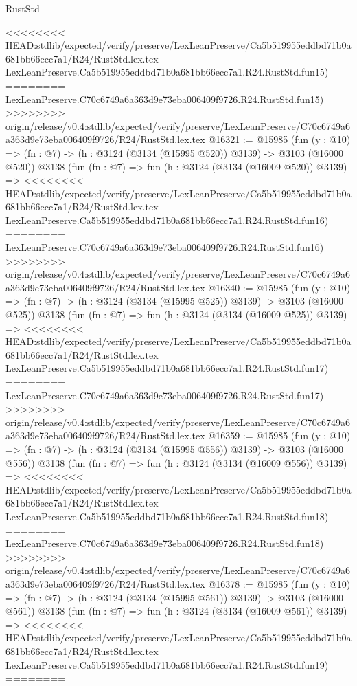 \begin{lexlean}{RustStd}
\begin{coremodule}
{\begin{coremodule}
{{{{{{{{{{{{{{{{{{{{{{{{{{<<<<<<<< HEAD:stdlib/expected/verify/preserve/LexLeanPreserve/Ca5b519955eddbd71b0a681bb66ecc7a1/R24/RustStd.lex.tex
    LexLeanPreserve.Ca5b519955eddbd71b0a681bb66ecc7a1.R24.RustStd.fun15)
========
    LexLeanPreserve.C70c6749a6a363d9e73eba006409f9726.R24.RustStd.fun15)
>>>>>>>> origin/release/v0.4:stdlib/expected/verify/preserve/LexLeanPreserve/C70c6749a6a363d9e73eba006409f9726/R24/RustStd.lex.tex
@16321 := @15985
    (fun (y : @10) => (fn : @7) -> (h : @3124 (@3134 (@15995 @520)) @3139) -> @3103 (@16000 @520))
    @3138
    (fun (fn : @7) =>
    fun (h : @3124 (@3134 (@16009 @520)) @3139) =>
<<<<<<<< HEAD:stdlib/expected/verify/preserve/LexLeanPreserve/Ca5b519955eddbd71b0a681bb66ecc7a1/R24/RustStd.lex.tex
    LexLeanPreserve.Ca5b519955eddbd71b0a681bb66ecc7a1.R24.RustStd.fun16)
========
    LexLeanPreserve.C70c6749a6a363d9e73eba006409f9726.R24.RustStd.fun16)
>>>>>>>> origin/release/v0.4:stdlib/expected/verify/preserve/LexLeanPreserve/C70c6749a6a363d9e73eba006409f9726/R24/RustStd.lex.tex
@16340 := @15985
    (fun (y : @10) => (fn : @7) -> (h : @3124 (@3134 (@15995 @525)) @3139) -> @3103 (@16000 @525))
    @3138
    (fun (fn : @7) =>
    fun (h : @3124 (@3134 (@16009 @525)) @3139) =>
<<<<<<<< HEAD:stdlib/expected/verify/preserve/LexLeanPreserve/Ca5b519955eddbd71b0a681bb66ecc7a1/R24/RustStd.lex.tex
    LexLeanPreserve.Ca5b519955eddbd71b0a681bb66ecc7a1.R24.RustStd.fun17)
========
    LexLeanPreserve.C70c6749a6a363d9e73eba006409f9726.R24.RustStd.fun17)
>>>>>>>> origin/release/v0.4:stdlib/expected/verify/preserve/LexLeanPreserve/C70c6749a6a363d9e73eba006409f9726/R24/RustStd.lex.tex
@16359 := @15985
    (fun (y : @10) => (fn : @7) -> (h : @3124 (@3134 (@15995 @556)) @3139) -> @3103 (@16000 @556))
    @3138
    (fun (fn : @7) =>
    fun (h : @3124 (@3134 (@16009 @556)) @3139) =>
<<<<<<<< HEAD:stdlib/expected/verify/preserve/LexLeanPreserve/Ca5b519955eddbd71b0a681bb66ecc7a1/R24/RustStd.lex.tex
    LexLeanPreserve.Ca5b519955eddbd71b0a681bb66ecc7a1.R24.RustStd.fun18)
========
    LexLeanPreserve.C70c6749a6a363d9e73eba006409f9726.R24.RustStd.fun18)
>>>>>>>> origin/release/v0.4:stdlib/expected/verify/preserve/LexLeanPreserve/C70c6749a6a363d9e73eba006409f9726/R24/RustStd.lex.tex
@16378 := @15985
    (fun (y : @10) => (fn : @7) -> (h : @3124 (@3134 (@15995 @561)) @3139) -> @3103 (@16000 @561))
    @3138
    (fun (fn : @7) =>
    fun (h : @3124 (@3134 (@16009 @561)) @3139) =>
<<<<<<<< HEAD:stdlib/expected/verify/preserve/LexLeanPreserve/Ca5b519955eddbd71b0a681bb66ecc7a1/R24/RustStd.lex.tex
    LexLeanPreserve.Ca5b519955eddbd71b0a681bb66ecc7a1.R24.RustStd.fun19)
========
}}}}}}}}}}}}}}}}}}}}}}}}}}
\end{coremodule}}
\end{coremodule}
\end{lexlean}
